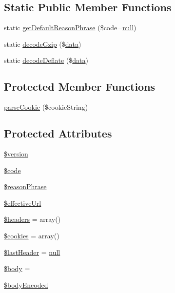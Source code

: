 \subsection*{Static Public Member Functions}
\begin{DoxyCompactItemize}
\item 
static \hyperlink{classHTTP__Request2__Response_ae6a45aaf10437d67b4710d61702d9819}{get\+Default\+Reason\+Phrase} (\$code=\hyperlink{modernizr_8min_8js_a286f9ec831c5e676eeb493248eab9575}{null})
\item 
static \hyperlink{classHTTP__Request2__Response_aa599a743d6dfcdec596d58f359b22566}{decode\+Gzip} (\$\hyperlink{document__category_8js_a94b4f25375ac17cb917012e05bf514a7}{data})
\item 
static \hyperlink{classHTTP__Request2__Response_ae43f4b1062afa9036c71e3c506d5979e}{decode\+Deflate} (\$\hyperlink{document__category_8js_a94b4f25375ac17cb917012e05bf514a7}{data})
\end{DoxyCompactItemize}
\subsection*{Protected Member Functions}
\begin{DoxyCompactItemize}
\item 
\hyperlink{classHTTP__Request2__Response_a98d67c4a923e69edcfbca9233dd71a81}{parse\+Cookie} (\$cookie\+String)
\end{DoxyCompactItemize}
\subsection*{Protected Attributes}
\begin{DoxyCompactItemize}
\item 
\hyperlink{classHTTP__Request2__Response_aadbcb4df3711846a3b890c5492c4ffe7}{\$version}
\item 
\hyperlink{classHTTP__Request2__Response_a974eeb592b307dca6c7d02e0311832f5}{\$code}
\item 
\hyperlink{classHTTP__Request2__Response_ab9faa50ba9b9f208a02a7c4ce75b391a}{\$reason\+Phrase}
\item 
\hyperlink{classHTTP__Request2__Response_ab87ff3f614066accc95a6f29f23bc051}{\$effective\+Url}
\item 
\hyperlink{classHTTP__Request2__Response_a17017d7d7f6452267ba57ecd0e10fa35}{\$headers} = array()
\item 
\hyperlink{classHTTP__Request2__Response_af1d49532aaf677e27046fafff4f5e985}{\$cookies} = array()
\item 
\hyperlink{classHTTP__Request2__Response_adcf7a1e02f6e5d9eac767466f8551a1e}{\$last\+Header} = \hyperlink{modernizr_8min_8js_a286f9ec831c5e676eeb493248eab9575}{null}
\item 
\hyperlink{classHTTP__Request2__Response_a3f5cdce9656ed7bd31859b5778169f66}{\$body} = \textquotesingle{}\textquotesingle{}
\item 
\hyperlink{classHTTP__Request2__Response_a1ab2bec927b0ac3d7cf82888479a4fea}{\$body\+Encoded}
\end{DoxyCompactItemize}
